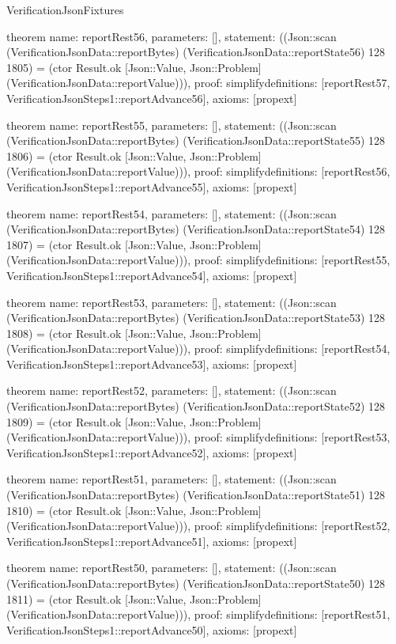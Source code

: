 \begin{lexlean}{VerificationJsonFixtures}
\begin{semanticmodule}
theorem{
  name: reportRest56,
  parameters: [],
  statement: ((Json::scan (VerificationJsonData::reportBytes) (VerificationJsonData::reportState56) 128 1805) = (ctor Result.ok [Json::Value, Json::Problem] (VerificationJsonData::reportValue))),
  proof: simplify{definitions: [reportRest57, VerificationJsonSteps1::reportAdvance56]},
  axioms: [propext]
}

theorem{
  name: reportRest55,
  parameters: [],
  statement: ((Json::scan (VerificationJsonData::reportBytes) (VerificationJsonData::reportState55) 128 1806) = (ctor Result.ok [Json::Value, Json::Problem] (VerificationJsonData::reportValue))),
  proof: simplify{definitions: [reportRest56, VerificationJsonSteps1::reportAdvance55]},
  axioms: [propext]
}

theorem{
  name: reportRest54,
  parameters: [],
  statement: ((Json::scan (VerificationJsonData::reportBytes) (VerificationJsonData::reportState54) 128 1807) = (ctor Result.ok [Json::Value, Json::Problem] (VerificationJsonData::reportValue))),
  proof: simplify{definitions: [reportRest55, VerificationJsonSteps1::reportAdvance54]},
  axioms: [propext]
}

theorem{
  name: reportRest53,
  parameters: [],
  statement: ((Json::scan (VerificationJsonData::reportBytes) (VerificationJsonData::reportState53) 128 1808) = (ctor Result.ok [Json::Value, Json::Problem] (VerificationJsonData::reportValue))),
  proof: simplify{definitions: [reportRest54, VerificationJsonSteps1::reportAdvance53]},
  axioms: [propext]
}

theorem{
  name: reportRest52,
  parameters: [],
  statement: ((Json::scan (VerificationJsonData::reportBytes) (VerificationJsonData::reportState52) 128 1809) = (ctor Result.ok [Json::Value, Json::Problem] (VerificationJsonData::reportValue))),
  proof: simplify{definitions: [reportRest53, VerificationJsonSteps1::reportAdvance52]},
  axioms: [propext]
}

theorem{
  name: reportRest51,
  parameters: [],
  statement: ((Json::scan (VerificationJsonData::reportBytes) (VerificationJsonData::reportState51) 128 1810) = (ctor Result.ok [Json::Value, Json::Problem] (VerificationJsonData::reportValue))),
  proof: simplify{definitions: [reportRest52, VerificationJsonSteps1::reportAdvance51]},
  axioms: [propext]
}

theorem{
  name: reportRest50,
  parameters: [],
  statement: ((Json::scan (VerificationJsonData::reportBytes) (VerificationJsonData::reportState50) 128 1811) = (ctor Result.ok [Json::Value, Json::Problem] (VerificationJsonData::reportValue))),
  proof: simplify{definitions: [reportRest51, VerificationJsonSteps1::reportAdvance50]},
  axioms: [propext]
}


\end{semanticmodule}
\end{lexlean}
